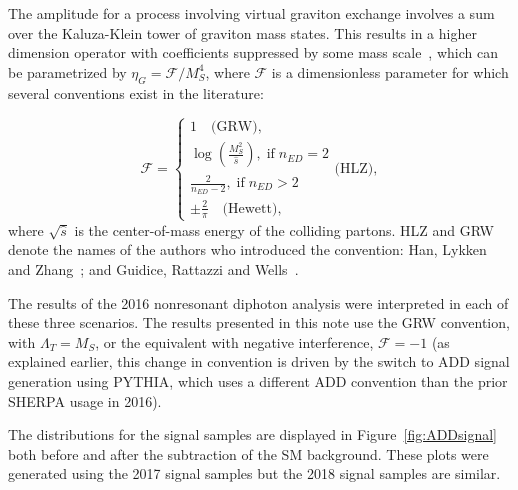 The amplitude for a process involving virtual graviton exchange involves a sum over the Kaluza-Klein tower of graviton mass states.
This results in a higher dimension operator with coefficients suppressed by some mass scale~\cite{Gleisberg:2003ue}, which can be parametrized by $\eta_G = \mathcal{F}/M_S^4$, where $\mathcal{F}$ is a dimensionless parameter for which several conventions exist in the literature:

\begin{equation}
\label{eqn:add_f_conventions}
\mathcal{F} =
\begin{cases}
1 \quad \text{(GRW)}, \\
\log\left(\frac{M_S^2}{\hat{s}} \right) , \; \text{if} \; n_{ED} = 2 \\
\frac{2}{n_{ED} - 2} , \; \text{if} \; n_{ED} > 2 \\
\pm\frac{2}{\pi} \quad \text{(Hewett}),
\end{cases}
\text{(HLZ)} ,
\end{equation}
where $\sqrt{\hat{s}}$ is the center-of-mass energy of the colliding partons.
HLZ and GRW denote the names of the authors who introduced the convention: Han, Lykken and Zhang~\cite{Han:1998sg}; and Guidice, Rattazzi and Wells~\cite{Giudice:1998ck}.

The results of the 2016 nonresonant diphoton analysis were interpreted in each of these three scenarios. The results presented in this note use the GRW convention, with $\Lambda_{T} = M_{S}$, or the equivalent with negative interference, $\mathcal{F} = -1$ (as explained earlier, this change in convention is driven by the switch to ADD signal generation using PYTHIA, which uses a different ADD convention than the prior SHERPA usage in 2016).

The \mgg distributions for the signal samples are displayed in Figure~\ref{fig:ADDsignal} both before and after the subtraction of the SM background.
These plots were generated using the 2017 signal samples but the 2018 signal samples are similar.



